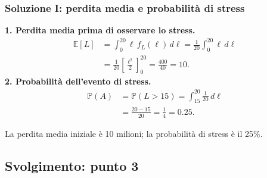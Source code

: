 \documentclass[handout]{beamer}%
\providecommand{\E}{\mathbb{E}}
\providecommand{\Prob}{\mathbb{P}}
\providecommand{\1}{\mathbf{1}}
\providecommand{\QTR}[2]{\csname #1\endcsname{#2}}
\begin{document}
\begin{frame}%
\frametitle{Soluzione I: perdita media e probabilit\`{a} di stress}
%


\textbf{1. Perdita media prima di osservare lo stress.}
\[
\begin{aligned}
\E[L]&=\int_0^{20}\ell\,f_L(\ell)\,d\ell
=\frac1{20}\int_0^{20}\ell\,d\ell\\
&=\frac1{20}\left[\frac{\ell^2}{2}\right]_0^{20}
=\frac{400}{40}=10.
\end{aligned}
\]
\medskip\textbf{2. Probabilit\`{a} dell'evento di stress.}
\[
\begin{aligned}
\Prob(A)&=\Prob(L>15)=\int_{15}^{20}\frac1{20}\,d\ell\\
&=\frac{20-15}{20}=\frac14=0.25.
\end{aligned}
\]
\medskip

\begin{center}
\textcolor{light-blue}{La perdita media iniziale \`{e} 10 milioni; la probabilit\`{a} di stress \`{e} il 25\%.}
\end{center}%

\end{frame}%


\subsection{Svolgimento: punto 3}%
\end{document}
